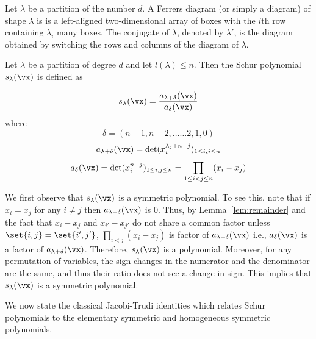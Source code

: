 Let $\lambda$ be a partition of the number $d$. A Ferrers diagram (or simply a diagram) of shape $\lambda$ is is a left-aligned two-dimensional array of boxes with the $i$th row containing $\lambda_i$ many boxes.  The conjugate of $\lambda$, denoted by $\lambda'$, is the diagram obtained by switching the rows and columns of the diagram of $\lambda$. 

%
%
 
\begin{definition} \label{def: Schur defn}
Let $\lambda$ be a partition of degree $d$ and let $l(\lambda) \leq n$. Then the Schur polynomial $s_\lambda(\vx)$ is defined as 
	
	$$s_\lambda(\vx)= \frac{a_{\lambda+\delta}(\vx)}{a_\delta(\vx)}$$
	where $$\delta = (n-1,n-2, \ldots \ldots 2,1,0)$$ \quad  $$a_{\lambda+\delta}(\vx)=\det(x_i^{\lambda_j+n-j})_{1 \leq i,j \leq n}$$ \quad 
	$$a_{\delta}(\vx)=\det(x_i^{n-j})_{1 \leq i,j \leq n}= \prod\limits_{\substack{1 \leq i<j \leq n}}(x_i-x_j)$$
\end{definition}

We first observe that $s_\lambda(\vx)$ is a symmetric polynomial. To see this, note that if $x_i=x_j$ for any $i \neq j$ then $a_{\lambda+\delta}(\vx)$ is $0$. Thus, by Lemma~\ref{lem:remainder} and the fact that $x_i-x_j$ and $x_{i'}-x_{j'}$ do not share a common factor unless $\set{i, j} = \set{i', j'}$, $\prod_{i<j}(x_i-x_j)$ is factor of $a_{\lambda+\delta}(\vx)$ i.e., $a_\delta(\vx)$ is a factor of $a_{\lambda+\delta}(\vx)$. Therefore, $s_\lambda(\vx)$ is a polynomial. Moreover, for any permutation of variables, the sign changes in the numerator and the denominator are the same, and thus their ratio does not see a change in sign. This implies that $s_{\lambda}(\vx)$ is a symmetric polynomial. 

We now state the classical Jacobi-Trudi identities which relates Schur polynomials to the elementary symmetric and homogeneous symmetric polynomials.
%

